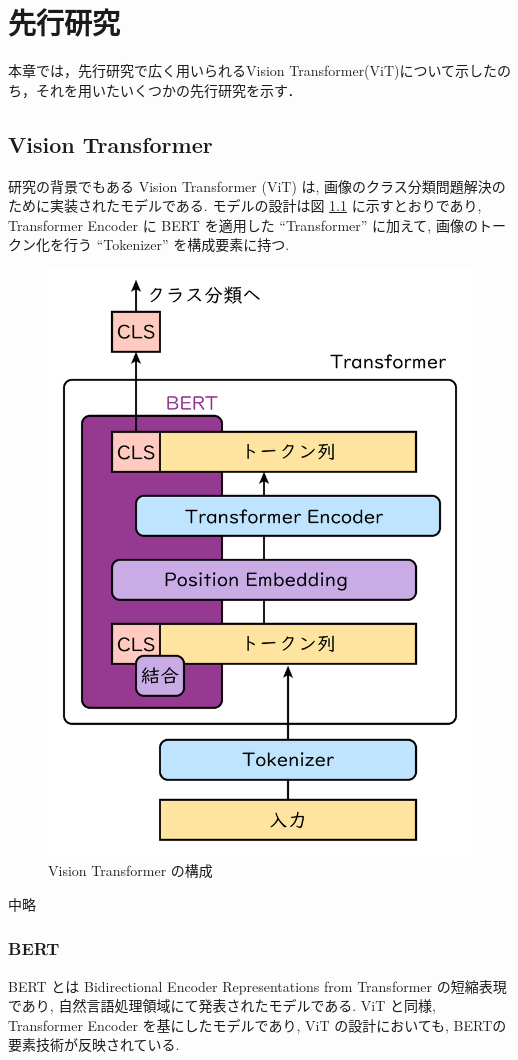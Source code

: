 \chapter{先行研究}\label{sec:RecentWorks}
本章では，先行研究で広く用いられるVision Transformer(ViT)について示したのち，それを用いたいくつかの先行研究を示す．

\section{Vision Transformer}\label{sec:ViT}

研究の背景でもある Vision Transformer (ViT) \cite{ref:yao2017integrated} は,
画像のクラス分類問題解決のために実装されたモデルである. 
モデルの設計は図 \ref{fig:vit_design} に示すとおりであり, 
Transformer Encoder \cite{ref:yao2017integrated} に BERT \cite{ref:ugarte1992curling} を適用した
``Transformer'' に加えて, 画像のトークン化を行う ``Tokenizer'' を構成要素に持つ. 
\begin{figure}[htbp]
  \centering
  \includegraphics[width=.4\textwidth]{figure/vit_design.png}
  \caption{Vision Transformer の構成}
  \label{fig:vit_design}
\end{figure}

中略

\subsection{BERT}\label{sec:bert}
BERT \cite{ref:ugarte1992curling} とは Bidirectional Encoder Representations from
Transformer の短縮表現であり, 自然言語処理領域にて発表されたモデルである.
ViT と同様, Transformer Encoder を基にしたモデルであり,
ViT の設計においても, BERTの要素技術が反映されている.

